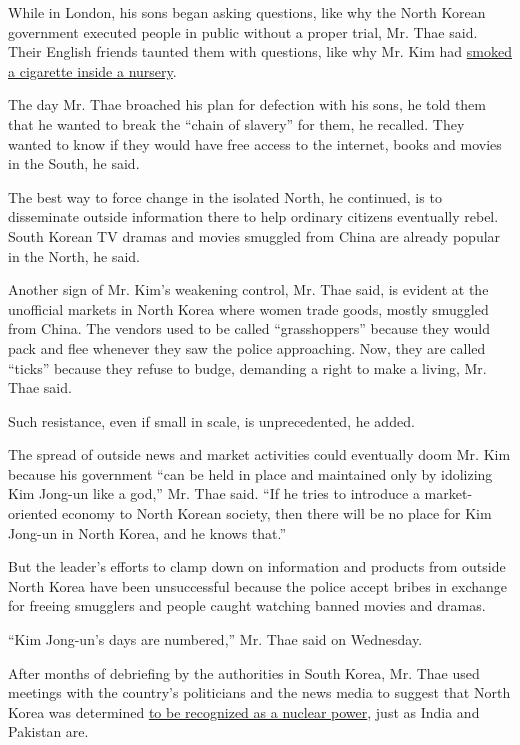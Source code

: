 While in London, his sons began asking questions, like why the North
Korean government executed people in public without a proper trial, Mr.
Thae said. Their English friends taunted them with questions, like why
Mr. Kim had \href{http://i.imgur.com/NjWEnVp.jpg}{smoked a cigarette
inside a nursery}.

The day Mr. Thae broached his plan for defection with his sons, he told
them that he wanted to break the ``chain of slavery'' for them, he
recalled. They wanted to know if they would have free access to the
internet, books and movies in the South, he said.

The best way to force change in the isolated North, he continued, is to
disseminate outside information there to help ordinary citizens
eventually rebel. South Korean TV dramas and movies smuggled from China
are already popular in the North, he said.

Another sign of Mr. Kim's weakening control, Mr. Thae said, is evident
at the unofficial markets in North Korea where women trade goods, mostly
smuggled from China. The vendors used to be called ``grasshoppers''
because they would pack and flee whenever they saw the police
approaching. Now, they are called ``ticks'' because they refuse to
budge, demanding a right to make a living, Mr. Thae said.

Such resistance, even if small in scale, is unprecedented, he added.

The spread of outside news and market activities could eventually doom
Mr. Kim because his government ``can be held in place and maintained
only by idolizing Kim Jong-un like a god,'' Mr. Thae said. ``If he tries
to introduce a market-oriented economy to North Korean society, then
there will be no place for Kim Jong-un in North Korea, and he knows
that.''

But the leader's efforts to clamp down on information and products from
outside North Korea have been unsuccessful because the police accept
bribes in exchange for freeing smugglers and people caught watching
banned movies and dramas.

``Kim Jong-un's days are numbered,'' Mr. Thae said on Wednesday.

After months of debriefing by the authorities in South Korea, Mr. Thae
used meetings with the country's politicians and the news media to
suggest that North Korea was determined
\href{https://www.nytimes.com/2016/12/27/world/asia/thae-yong-ho-north-korea-defector.html}{to
be recognized as a nuclear power}, just as India and Pakistan are.

